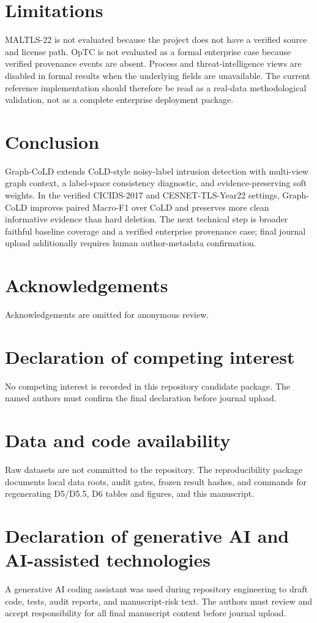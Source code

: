 \documentclass[preprint,review,12pt]{elsarticle}
\begin{document}
\section{Limitations}
MALTLS-22 is not evaluated because the project does not have a verified source
and license path. OpTC is not evaluated as a formal enterprise case because
verified provenance events are absent. Process and threat-intelligence views are
disabled in formal results when the underlying fields are unavailable. The
current reference implementation should therefore be read as a real-data
methodological validation, not as a complete enterprise deployment package.

\section{Conclusion}
Graph-CoLD extends CoLD-style noisy-label intrusion detection with multi-view
graph context, a label-space consistency diagnostic, and evidence-preserving
soft weights. In the verified CICIDS-2017 and CESNET-TLS-Year22 settings,
Graph-CoLD improves paired Macro-F1 over CoLD and preserves more clean
informative evidence than hard deletion. The next technical step is broader faithful baseline coverage and a verified
enterprise provenance case; final journal upload additionally requires human
author-metadata confirmation.

\section*{Acknowledgements}
Acknowledgements are omitted for anonymous review.

\section*{Declaration of competing interest}
No competing interest is recorded in this repository candidate package. The named
authors must confirm the final declaration before journal upload.

\section*{Data and code availability}
Raw datasets are not committed to the repository. The reproducibility package
documents local data roots, audit gates, frozen result hashes, and commands for
regenerating D5/D5.5, D6 tables and figures, and this manuscript.

\section*{Declaration of generative AI and AI-assisted technologies}
A generative AI coding assistant was used during repository engineering to draft
code, tests, audit reports, and manuscript-risk text. The authors must review and
accept responsibility for all final manuscript content before journal upload.



\end{document}
